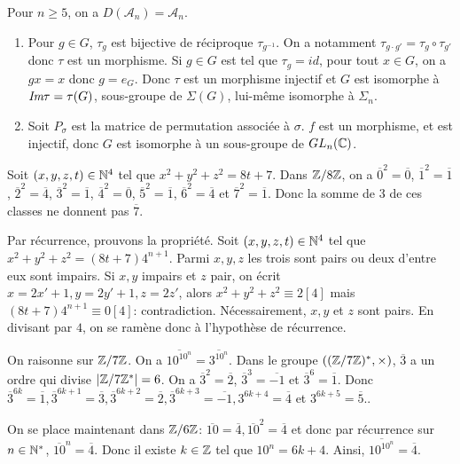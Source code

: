 \begin{remark}
	Pour $n\geqslant5$, on a $D(\mathcal{A}_{n})=\mathcal{A}_{n}$.
\end{remark}

\begin{solution}
	\phantom{}
	\begin{enumerate}
		\item Pour $g\in G$, $\tau_{g}$ est bijective de réciproque $\tau_{g^{-1}}$. On a notamment $\tau_{g\cdot g'}=\tau_{g}\circ\tau_{g'}$ donc $\tau$ est un morphisme. Si $g\in G$ est tel que $\tau_{g}=id$, pour tout $x\in G$, on a $gx=x$ donc $g=e_{G}$. Donc $\tau$ est un morphisme injectif et $G$ est isomorphe à $\emph{Im}\tau=\tau(G)$, sous-groupe de $\Sigma(G)$, lui-même isomorphe à $\Sigma_{n}$.
		
		\item Soit 
		$P_{\sigma}$ est la matrice de permutation associée à $\sigma$. $f$ est un morphisme, et est injectif, donc $G$ est isomorphe à un sous-groupe de $GL_{n}(\mathbb{C})$.
	\end{enumerate}
\end{solution}

\begin{solution}
	Soit $(x,y,z,t)\in\mathbb{N}^{4}$ tel que $x^{2}+y^{2}+z^{2}=8t+7$. Dans $\mathbb{Z}/8\mathbb{Z}$, on a $\overline{0}^{2}=\overline{0}$, $\overline{1}^{2}=\overline{1}$, $\overline{2}^{2}=\overline{4}$, $\overline{3}^{2}=\overline{1}$, $\overline{4}^{2}=\overline{0}$, $\overline{5}^{2}=\overline{1}$, $\overline{6}^{2}=\overline{4}$ et $\overline{7}^{2}=\overline{1}$. Donc la somme de 3 de ces classes ne donnent pas $\overline{7}$.

	Par récurrence, prouvons la propriété. Soit $(x,y,z,t)\in\mathbb{N}^{4}$ tel que $x^{2}+y^{2}+z^{2}=(8t+7)4^{n+1}$. Parmi $x,y,z$ les trois sont pairs ou deux d'entre eux sont impairs. Si $x,y$ impairs et $z$ pair, on écrit $x=2x'+1,y=2y'+1,z=2z'$, alors $x^{2}+y^{2}+z^{2}\equiv 2[4]$ mais $(8t+7)4^{n+1}\equiv 0[4]$: contradiction. Nécessairement, $x,y$ et $z$ sont pairs. En divisant par $4$, on se ramène donc à l'hypothèse de récurrence.
\end{solution}

\begin{solution}
	On raisonne sur $\mathbb{Z}/7\mathbb{Z}$. On a $\overline{10^{10^{n}}}=\overline{3^{10^{n}}}$. Dans le groupe $((\mathbb{Z}/7\mathbb{Z})^{*},\times)$, $\overline{3}$ a un ordre qui divise $\vert \mathbb{Z}/7\mathbb{Z}^{*}\vert=6$. On a $\overline{3}^{2}=\overline{2}$, $\overline{3}^{3}=\overline{-1}$ et $\overline{3}^{6}=\overline{1}$. Donc $\overline{3}^{6k}=\overline{1}, \overline{3}^{6k+1}=\overline{3},\overline{3}^{6k+2}=\overline{2},\overline{3}^{6k+3}=\overline{-1}, 3^{6k+4}=\overline{4}$ et $3^{6k+5}=\overline{5}$..

	On se place maintenant dans $\mathbb{Z}/6\mathbb{Z}$: $\overline{10}=\overline{4},\overline{10}^{2}=\overline{4}$ et donc par récurrence sur $n\in\mathbb{N}^{*}$, $\overline{10}^{n}=\overline{4}$. Donc il existe $k\in\mathbb{Z}$ tel que $10^{n}=6k+4$. Ainsi, $\overline{10^{10^{n}}}=\overline{4}$.
\end{solution}

